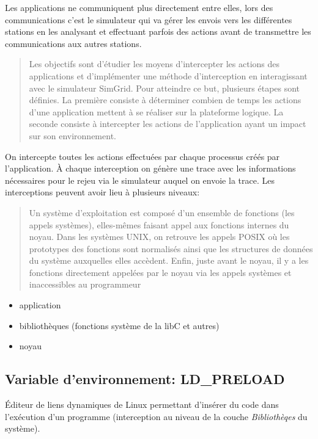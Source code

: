 \documentclass{article}
\begin{document}
Les applications ne communiquent plus directement entre elles, lors
des communications c'est le simulateur qui va gérer les envois vers
les différentes stations en les analysant et effectuant parfois des
actions avant de transmettre les communications aux autres stations.

\begin{quotation}
Les objectifs sont d’étudier les moyens d’intercepter les actions des
applications et d’implémenter une méthode d’interception en
interagissant avec le simulateur SimGrid. Pour atteindre ce but,
plusieurs étapes sont définies. La première consiste à déterminer
combien de temps les actions d’une application mettent à se réaliser
sur la plateforme logique. La seconde consiste à intercepter les
actions de l’application ayant un impact sur son environnement.
\end{quotation}
On intercepte toutes les actions effectuées par chaque processus créés
par l'application. À chaque interception on génère une trace avec les
informations nécessaires pour le rejeu via le simulateur auquel on
envoie la trace. Les interceptions peuvent avoir lieu à plusieurs
niveaux:

\begin{quotation}
{\color{green} Un système d’exploitation est composé d’un ensemble de
  fonctions (les appels systèmes), elles-mêmes faisant appel aux
  fonctions internes du noyau. Dans les systèmes UNIX, on retrouve les
  appels POSIX où les prototypes des fonctions sont normalisés ainsi
  que les structures de données du système auxquelles elles
  accèdent. Enfin, juste avant le noyau, il y a les fonctions
  directement appelées par le noyau via les appels systèmes et
  inaccessibles au programmeur }
\end{quotation}

\begin{itemize}
\item application
\item bibliothèques (fonctions système de la libC et autres)
\item noyau
\end{itemize}

\subsection{Variable d'environnement: LD\_PRELOAD}
Éditeur de liens dynamiques de Linux permettant d'insérer du code dans
l'exécution d'un programme (interception au niveau de la couche
\textit{Bibliothèqes} du système).
\end{document}
